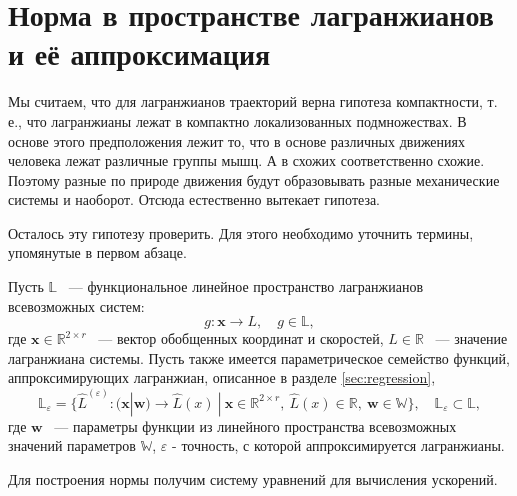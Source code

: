 \documentclass[a4paper, 12pt]{article}
\renewcommand{\epsilon}{\ensuremath{\varepsilon}}
\begin{document}
\section{Норма в пространстве лагранжианов и её аппроксимация}
Мы считаем, что для лагранжианов траекторий верна гипотеза компактности, т. е., что лагранжианы лежат в компактно локализованных подмножествах. В основе этого предположения лежит то, что в основе различных движениях человека лежат различные группы мышц. А в схожих соответственно схожие. Поэтому разные по природе движения будут образовывать разные механические системы и наоборот. Отсюда естественно вытекает гипотеза.

Осталось эту гипотезу проверить. Для этого необходимо уточнить термины, упомянутые в первом абзаце. 

Пусть $\mathbb{L}$ ~--- функциональное линейное пространство лагранжианов всевозможных систем:
\[ 
g: \mathbf{x} \to L, \quad g \in \mathbb{L},
\] 
где $\mathbf{x} \in \mathbb{R}^{2 \times r}$ ~--- вектор обобщенных координат и скоростей, $L \in \mathbb{R}$ ~--- значение лагранжиана системы. Пусть также имеется параметрическое семейство функций, аппроксимирующих лагранжиан, описанное в разделе \ref{sec:regression},
\[
 \mathbb{L}_{\epsilon} = \{ \hat{L}^{(\epsilon)} \colon (\mathbf{x} | \mathbf{w}) \to \hat{L}(x) \ | \ \mathbf{x} \in \mathbb{R}^{2 \times r}, \ \hat{L}(x)  \in \mathbb{R}, 
 \ \mathbf{w} \in \mathbb{W} \}, \quad \mathbb{L}_{\epsilon} \subset \mathbb{L},
\]
где $\mathbf{w}$ ~--- параметры функции из линейного пространства всевозможных значений параметров $\mathbb{W}$, $\epsilon$ - точность, с которой аппроксимируется лагранжианы.

Для построения нормы получим систему уравнений для вычисления ускорений.
\end{document}
